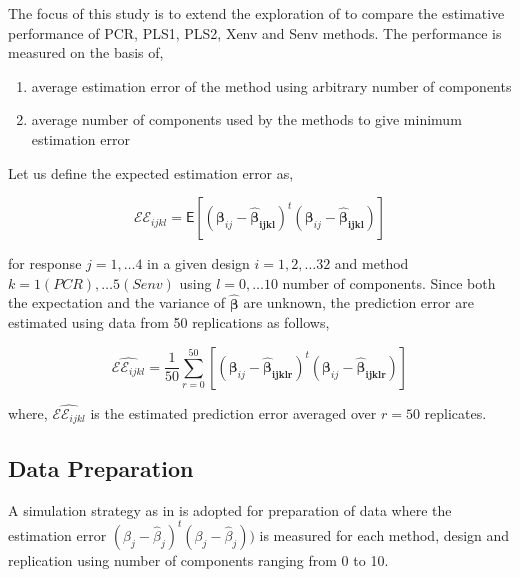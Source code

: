 \documentclass[12pt,3p,authoryear]{elsarticle}
\providecommand{\tightlist}{%
  \setlength{\itemsep}{0pt}\setlength{\parskip}{0pt}}
\begin{document}
The focus of this study is to extend the exploration of
\citet{rimal2019pred} to compare the estimative performance of PCR,
PLS1, PLS2, Xenv and Senv methods. The performance is measured on the
basis of,

\begin{enumerate}
\def\labelenumi{\alph{enumi})}
\tightlist
\item
  average estimation error of the method using arbitrary number of
  components
\item
  average number of components used by the methods to give minimum
  estimation error
\end{enumerate}

Let us define the expected estimation error as,

\begin{equation}
\mathcal{EE}_{ijkl} =
  \mathsf{E}{\left[\left(\boldsymbol{\beta}_{ij} -
  \boldsymbol{\hat{\beta}_{ijkl}}\right)^t
  \left(\boldsymbol{\beta}_{ij} - \boldsymbol{\hat{\beta}_{ijkl}}\right)\right]}
\label{eq:est-error}
\end{equation}

for response \(j = 1, \ldots 4\) in a given design \(i=1, 2, \ldots 32\)
and method \(k=1(PCR), \ldots 5(Senv)\) using \(l=0, \ldots 10\) number
of components. Since both the expectation and the variance of
\(\hat{\boldsymbol{\beta}}\) are unknown, the prediction error are
estimated using data from 50 replications as follows,

\begin{equation}
\widehat{\mathcal{EE}_{ijkl}} =
  \frac{1}{50}\sum_{r=0}^{50}{\left[\left(\boldsymbol{\beta}_{ij} -
  \boldsymbol{\hat{\beta}_{ijklr}}\right)^t
  \left(\boldsymbol{\beta}_{ij} - \boldsymbol{\hat{\beta}_{ijklr}}\right)\right]}
\label{eq:estimated-est-error}
\end{equation}

where, \(\widehat{\mathcal{EE}_{ijkl}}\) is the estimated prediction
error averaged over \(r=50\) replicates.

\subsection{Data Preparation}\label{data-preparation}

A simulation strategy as in \citet{rimal2019pred} is adopted for
preparation of data where the estimation error
\((\beta_j - \hat{\beta}_j)^t(\beta_j - \hat{\beta}_j))\) is measured
for each method, design and replication using number of components
ranging from 0 to 10.
\end{document}
